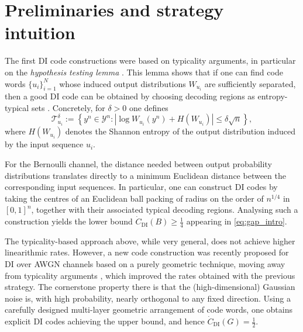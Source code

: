 \documentclass[10pt, conference]{IEEEtran}
\newcommand{\1}{\mathds{1}}
\begin{document}



\section{Preliminaries and strategy intuition}
The first DI code constructions were based on typicality arguments, in particular on the \emph{hypothesis testing lemma} \cite{CDBW:DI_classical}. This lemma shows that if one can find code words $\{u_i\}_{i=1}^N$ whose induced output distributions $W_{u_i}$ are sufficiently separated, then a good DI code can be obtained by choosing decoding regions as entropy-typical sets \cite{CK:book2011}. Concretely, for $\delta>0$ one defines
\begin{equation}\label{eq:entropy-typical-set}
\mathcal{T}_{u_i}^\delta \! := \left\{ y^n\in\mathcal{Y}^n \!: \left| \log W_{u_i}(y^n) \!+\! H(W_{u_i}) \right| \leq \delta\sqrt{n} \right\},
\end{equation}
where $H(W_{u_i})$ denotes the Shannon entropy of the output distribution induced by the input sequence $u_i$.

For the Bernoulli channel, the distance needed between output probability distributions translates directly to a minimum Euclidean distance between the corresponding input sequences. In particular, one can construct DI codes by taking the centres of an Euclidean ball packing of radius on the order of $n^{1/4}$ in $[0,1]^n$, together with their associated typical decoding regions. Analysing such a construction yields the lower bound $\dot C_{\text{DI}}(B)\geq \frac14$ appearing in \eqref{eq:gap_intro}.

The typicality-based approach above, while very general, does not achieve higher linearithmic rates. However, a new code construction was recently proposed for DI over AWGN channels based on a purely geometric technique, moving away from typicality arguments \cite{CDBW:Gauss}, which improved the rates obtained with the previous strategy. The cornerstone property there is that the (high-dimensional) Gaussian noise is, with high probability, nearly orthogonal to any fixed direction. Using a carefully designed multi-layer geometric arrangement of code words, one obtains explicit DI codes achieving the upper bound, and hence $\dot C_{\text{DI}}(G)=\frac12$.
\end{document}
